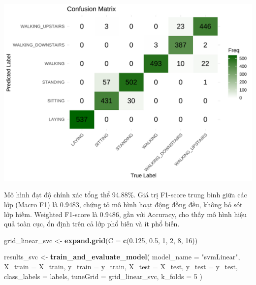 \documentclass[
]{article}
\newenvironment{Shaded}{\begin{snugshade}}{\end{snugshade}}
\newcommand{\AttributeTok}[1]{\textcolor[rgb]{0.13,0.29,0.53}{#1}}
\newcommand{\DecValTok}[1]{\textcolor[rgb]{0.00,0.00,0.81}{#1}}
\newcommand{\FloatTok}[1]{\textcolor[rgb]{0.00,0.00,0.81}{#1}}
\newcommand{\FunctionTok}[1]{\textcolor[rgb]{0.13,0.29,0.53}{\textbf{#1}}}
\newcommand{\NormalTok}[1]{#1}
\newcommand{\OtherTok}[1]{\textcolor[rgb]{0.56,0.35,0.01}{#1}}
\newcommand{\StringTok}[1]{\textcolor[rgb]{0.31,0.60,0.02}{#1}}
\begin{document}
\includegraphics{report_files/figure-latex/unnamed-chunk-25-1.pdf}

Mô hình đạt độ chính xác tổng thể 94.88\%. Giá trị F1-score trung bình
giữa các lớp (Macro F1) là 0.9483, chứng tỏ mô hình hoạt động đồng đều,
không bỏ sót lớp hiếm. Weighted F1-score là 0.9486, gần với Accuracy,
cho thấy mô hình hiệu quả toàn cục, ổn định trên cả lớp phổ biến và ít
phổ biến.

\begin{Shaded}
\begin{Highlighting}[]
\NormalTok{grid\_linear\_svc }\OtherTok{\textless{}{-}} \FunctionTok{expand.grid}\NormalTok{(}\AttributeTok{C =} \FunctionTok{c}\NormalTok{(}\FloatTok{0.125}\NormalTok{, }\FloatTok{0.5}\NormalTok{, }\DecValTok{1}\NormalTok{, }\DecValTok{2}\NormalTok{, }\DecValTok{8}\NormalTok{, }\DecValTok{16}\NormalTok{))}

\NormalTok{results\_svc }\OtherTok{\textless{}{-}} \FunctionTok{train\_and\_evaluate\_model}\NormalTok{(}
  \AttributeTok{model\_name =} \StringTok{"svmLinear"}\NormalTok{,}
  \AttributeTok{X\_train =}\NormalTok{ X\_train, }\AttributeTok{y\_train =}\NormalTok{ y\_train,}
  \AttributeTok{X\_test =}\NormalTok{ X\_test, }\AttributeTok{y\_test =}\NormalTok{ y\_test,}
  \AttributeTok{class\_labels =}\NormalTok{ labels,}
  \AttributeTok{tuneGrid =}\NormalTok{ grid\_linear\_svc,}
  \AttributeTok{k\_folds =} \DecValTok{5}
\NormalTok{)}
\end{Highlighting}
\end{Shaded}
\end{document}
